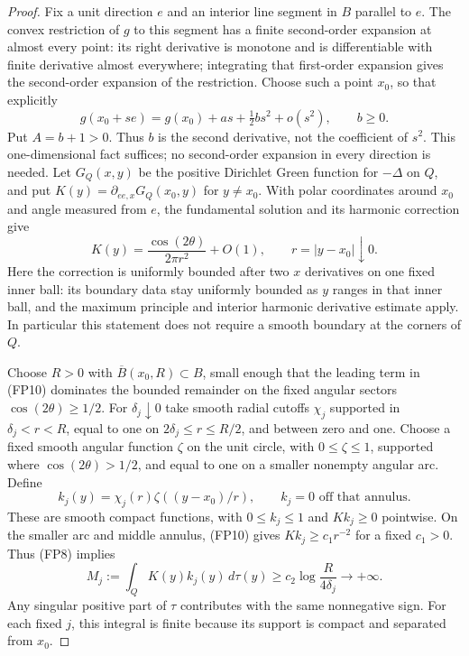 \begin{proof}
Fix a unit direction $e$ and an interior line segment in $B$
parallel to $e$. The convex restriction of $g$ to this segment
has a finite second-order expansion at almost every point:
its right derivative is monotone and is differentiable with finite
derivative almost everywhere; integrating that first-order
expansion gives the second-order expansion of the restriction.
Choose such a point $x_0$, so that explicitly
\[
 g(x_0+se)=g(x_0)+a s+\tfrac12 b s^2+o(s^2),
                         \qquad b\ge0.
\]
Put $A=b+1>0$. Thus $b$ is the second derivative, not the
coefficient of $s^2$. This one-dimensional fact
suffices; no second-order expansion in every direction is needed.
Let $G_Q(x,y)$ be the positive Dirichlet Green function for
$-\Delta$ on $Q$, and put
$K(y)=\partial_{ee,x}G_Q(x_0,y)$ for $y\ne x_0$.
With polar coordinates around $x_0$ and angle measured from $e$,
the fundamental solution and its harmonic correction give
\[
 K(y)=\frac{\cos(2\theta)}{2\pi r^2}+O(1),\qquad
                    r=|y-x_0|\downarrow0.
 \tag{FP10}
\]
Here the correction is uniformly bounded after two $x$ derivatives
on one fixed inner ball: its boundary data stay uniformly bounded
as $y$ ranges in that inner ball, and the maximum principle and
interior harmonic derivative estimate apply. In particular this
statement does not require a smooth boundary at the corners of $Q$.

Choose $R>0$ with $\overline B(x_0,R)\subset B$, small enough
that the leading term in (FP10) dominates the bounded remainder
on the fixed angular sectors $\cos(2\theta)\ge1/2$.
For $\delta_j\downarrow0$ take smooth radial cutoffs $\chi_j$
supported in $\delta_j<r<R$, equal to one on
$2\delta_j\le r\le R/2$, and between zero and one.
Choose a fixed smooth angular function $\zeta$ on the unit circle,
with $0\le\zeta\le1$, supported where $\cos(2\theta)>1/2$,
and equal to one on a smaller nonempty angular arc. Define
\[
 k_j(y)=\chi_j(r)\zeta((y-x_0)/r),
 \qquad k_j=0\text{ off that annulus}.
 \tag{FP11}
\]
These are smooth compact functions, with $0\le k_j\le1$ and
$Kk_j\ge0$ pointwise. On the smaller arc and middle annulus,
(FP10) gives $Kk_j\ge c_1r^{-2}$ for a fixed $c_1>0$.
Thus (FP8) implies
\[
 M_j:=\int_QK(y)k_j(y)\,d\tau(y)
       \ge c_2\log\frac{R}{4\delta_j}\longrightarrow+\infty.
 \tag{FP12}
\]
Any singular positive part of $\tau$ contributes with the same
nonnegative sign. For each fixed $j$, this integral is finite
because its support is compact and separated from $x_0$.


\end{proof}
